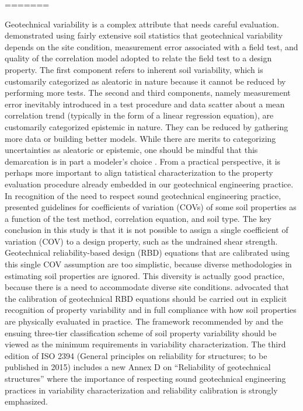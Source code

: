 \begin{paracol}{2}
=======
\begin{Parallel}{0.60\textwidth}{}
    \ParallelLText
    {
        Geotechnical variability is a complex attribute that needs careful evaluation. \citet{Phoon1999612} demonstrated using fairly extensive soil statistics that geotechnical variability depends on the site condition, measurement error associated with a field test, and quality of the correlation model adopted to relate the field test to a design property. The first component refers to inherent soil variability, which is customarily categorized as aleatoric in nature because it cannot be reduced by performing more tests. The second and third components, namely measurement error inevitably introduced in a test procedure and data scatter about a mean correlation trend (typically in the form of a linear regression equation), are customarily categorized epistemic in nature. They can be reduced by gathering more data or building better models. While there are merits to categorizing uncertainties as aleatoric or epistemic, one should be mindful that this demarcation is in part a modeler’s choice \citep{DerKiureghian2007}. From a practical perspective, it is perhaps more important to align tatistical characterization to the property evaluation procedure already embedded in our geotechnical engineering practice. In recognition of the need to respect sound geotechnical engineering practice, \citet{Phoon1999625} presented guidelines for coefficients of variation (COVs) of some soil properties as a function of the test method, correlation equation, and soil type. The key conclusion in this study is that it is not possible to assign a single coefficient of variation (COV) to a design property, such as the undrained shear strength. Geotechnical reliability-based design (RBD) equations that are calibrated using this single COV assumption are too simplistic, because diverse methodologies in estimating soil properties are ignored. This diversity is actually good practice, because there is a need to accommodate diverse site conditions. \citet{Phoon1999612,Phoon1999625} advocated that the calibration of geotechnical RBD equations should be carried out in explicit recognition of property variability and in full compliance with how soil properties are physically evaluated in practice. The framework recommended by \citet{Phoon1999612,Phoon1999625} and the ensuing three-tier classification scheme of soil property variability \citep{Phoon2008344} should be viewed as the minimum requirements in variability characterization. The third edition of ISO 2394 (General principles on reliability for structures; to be published in 2015) includes a new Annex D on “Reliability of geotechnical structures” where the importance of respecting sound geotechnical engineering practices in variability characterization and reliability calibration is strongly emphasized.
}
\end{Parallel}
\end{paracol}
